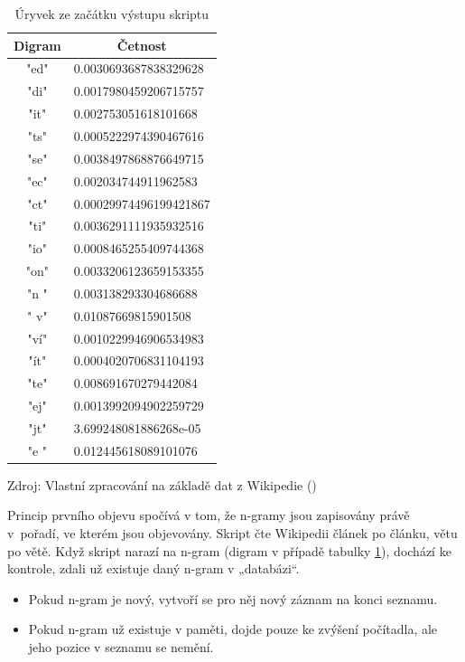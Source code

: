 \documentclass[a4paper, twoside, 12pt, czech]{article}
\begin{document}
\begin{table}[h!] %
    \centering
    \caption{Úryvek ze začátku výstupu skriptu}
    \vspace{0.3cm}
\begin{tabular}{|c|l|}
\hline
Digram & \multicolumn{1}{c|}{Četnost} \\ \hline
"ed"   & 0.0030693687838329628        \\ \hline
"di"   & 0.0017980459206715757        \\ \hline
"it"   & 0.002753051618101668         \\ \hline
"ts"   & 0.0005222974390467616        \\ \hline
"se"   & 0.0038497868876649715        \\ \hline
"ec"   & 0.002034744911962583         \\ \hline
"ct"   & 0.00029974496199421867       \\ \hline
"ti"   & 0.0036291111935932516        \\ \hline
"io"   & 0.0008465255409744368        \\ \hline
"on"   & 0.0033206123659153355        \\ \hline
"n "   & 0.003138293304686688         \\ \hline
" v"   & 0.01087669815901508          \\ \hline
"ví"   & 0.0010229946906534983        \\ \hline
"ít"   & 0.0004020706831104193        \\ \hline
"te"   & 0.008691670279442084         \\ \hline
"ej"   & 0.0013992094902259729        \\ \hline
"jt"   & 3.699248081886268e-05        \\ \hline
"e "   & 0.012445618089101076         \\ \hline
\end{tabular}

\vspace{0.2cm}
\small{Zdroj: Vlastní zpracování na základě dat z Wikipedie (\cite{wikidump})}
\label{table:korpus}
\end{table}


Princip prvního objevu spočívá v tom, že n-gramy jsou zapisovány právě v~pořadí, ve kterém 
jsou objevovány. Skript čte Wikipedii článek po článku, větu po větě. Když skript narazí na n-gram
(digram v případě tabulky \ref{table:korpus}), dochází ke kontrole, zdali už existuje daný n-gram v „databázi“.
\begin{itemize}
    \item Pokud n-gram je nový, vytvoří se pro něj nový záznam na konci seznamu.
    \item Pokud n-gram už existuje v paměti, dojde pouze ke zvýšení počítadla, ale jeho pozice 
    v seznamu se nemění.
\end{itemize}
\end{document}
